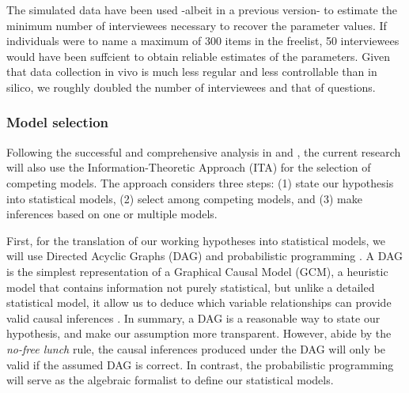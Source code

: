 The simulated data have been used -albeit in a previous version- to estimate the minimum number of interviewees necessary to recover the parameter values. If individuals were to name a maximum of 300 items in the freelist, 50 interviewees would have been suffcient to obtain reliable estimates of the parameters. Given that data collection in vivo is much less regular and less controllable than in silico, we roughly doubled the number of interviewees and that of questions.
%
%
\subsubsection{Model selection} \label{ssSA:model_selection}
%
Following the successful and comprehensive analysis in \citet{vanDaal_2020} and \citet{Lesterhuis_2018}, the current research will also use the Information-Theoretic Approach (ITA) \citep{Anderson_2008, Chamberlain_1965} for the selection of competing models. The approach considers three steps: (1) state our hypothesis into statistical models, (2) select among competing models, and (3) make inferences based on one or multiple models.

First, for the translation of our working hypotheses into statistical models, we will use Directed Acyclic Graphs (DAG) and probabilistic programming \citep{Jaynes_2003}. A DAG is the simplest representation of a Graphical Causal Model (GCM), a heuristic model that contains information not purely statistical, but unlike a detailed statistical model, it allow us to deduce which variable relationships can provide valid causal inferences \citep{Hernan_et_al_2020, McElreath_2020}. In summary, a DAG is a reasonable way to state our hypothesis, and make our assumption more transparent. However, abide by the \textit{no-free lunch} rule, the causal inferences produced under the DAG will only be valid if the assumed DAG is correct. In contrast, the probabilistic programming will serve as the algebraic formalist to define our statistical models.

